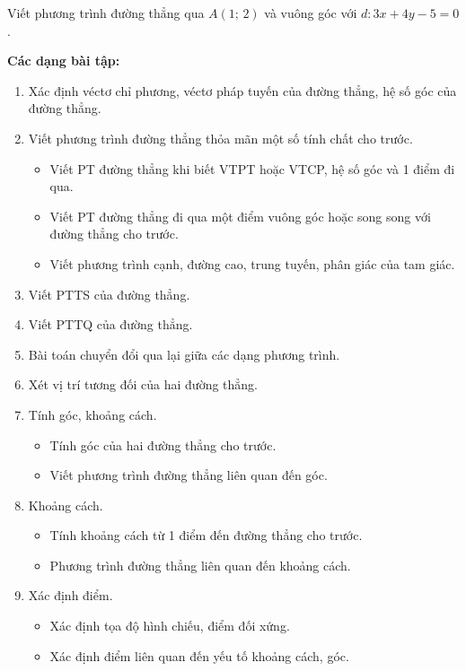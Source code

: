 \documentclass[12pt,a4paper]{article}
\begin{document}
\begin{vidu}
  Viết phương trình đường thẳng qua $A(1;\, 2)$ và vuông góc với $d\colon 3x + 4y - 5 = 0$.
\end{vidu}

\medskip\noindent\textbf{Các dạng bài tập:}
\begin{enumerate}[label=\textbf{Dạng \arabic*:}, leftmargin=*, align=left]
  \item Xác định véctơ chỉ phương, véctơ pháp tuyến của đường thẳng, hệ số góc của đường thẳng.
  \item Viết phương trình đường thẳng thỏa mãn một số tính chất cho trước.
    \begin{itemize}
      \item Viết PT đường thẳng khi biết VTPT hoặc VTCP, hệ số góc và 1 điểm đi qua.
      \item Viết PT đường thẳng đi qua một điểm vuông góc hoặc song song với đường thẳng cho trước.
      \item Viết phương trình cạnh, đường cao, trung tuyến, phân giác của tam giác.
    \end{itemize}
  \item Viết PTTS của đường thẳng.
  \item Viết PTTQ của đường thẳng.
  \item Bài toán chuyển đổi qua lại giữa các dạng phương trình.
  \item Xét vị trí tương đối của hai đường thẳng.
  \item Tính góc, khoảng cách.
    \begin{itemize}
      \item Tính góc của hai đường thẳng cho trước.
      \item Viết phương trình đường thẳng liên quan đến góc.
    \end{itemize}
  \item Khoảng cách.
    \begin{itemize}
      \item Tính khoảng cách từ 1 điểm đến đường thẳng cho trước.
      \item Phương trình đường thẳng liên quan đến khoảng cách.
    \end{itemize}
  \item Xác định điểm.
    \begin{itemize}
      \item Xác định tọa độ hình chiếu, điểm đối xứng.
      \item Xác định điểm liên quan đến yếu tố khoảng cách, góc.
    \end{itemize}
\end{enumerate}
\end{document}
